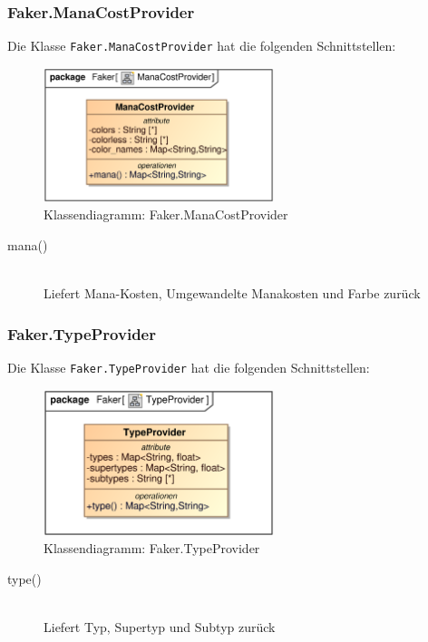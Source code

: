 \subsubsection{Faker.ManaCostProvider}
Die Klasse \verb|Faker.ManaCostProvider| hat die folgenden Schnittstellen:
\begin{figure}[H]
    \myfloatalign
    \includegraphics[width=0.6\textwidth]{gfx/MtGDeepAnalysis/ManaCostProvider.eps}
    \caption{Klassendiagramm: Faker.ManaCostProvider}
    \label{fig:class:Faker.ManaCostProvider}
\end{figure}
\begin{description}
    \item[mana()] \hfill \\
    Liefert Mana-Kosten, Umgewandelte Manakosten und Farbe zurück
\end{description}

\subsubsection{Faker.TypeProvider}
Die Klasse \verb|Faker.TypeProvider| hat die folgenden Schnittstellen:
\begin{figure}[H]
    \myfloatalign
    \includegraphics[width=0.6\textwidth]{gfx/MtGDeepAnalysis/TypeProvider.eps}
    \caption{Klassendiagramm: Faker.TypeProvider}
    \label{fig:class:Faker.TypeProvider}
\end{figure}
\begin{description}
    \item[type()] \hfill \\
    Liefert Typ, Supertyp und Subtyp zurück
\end{description}

